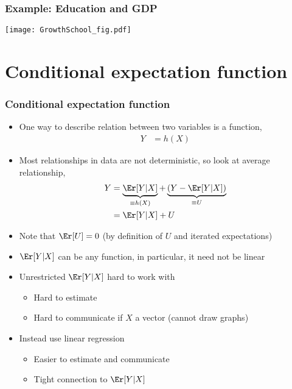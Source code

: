 \begin{frame}\frametitle{Example: Education and GDP}
\texttt{[image: GrowthSchool\_fig.pdf]}
\end{frame}


\section{Conditional expectation function}

\begin{frame}[allowframebreaks]
  \frametitle{Conditional expectation function}
  \begin{itemize}
  \item One way to describe relation between two variables is a
    function, 
    \begin{align*} 
Y &= h(X) 
\end{align*}
  \item Most relationships in data are not deterministic, so look at
    average relationship,
    \begin{align*}
      Y &=  \underbrace{\Er[Y|X]}_{\equiv h(X)} + \underbrace{\left(Y
          - \Er[Y|X]\right)}_{\equiv U}  \\  
      &= \Er[Y|X] + U
    \end{align*}
  \item Note that $\Er[U] = 0$ (by definition of $U$ and
    iterated expectations)
  \item $\Er[Y|X]$ can be any function, in particular, it need not be
    linear
  \item Unrestricted $\Er[Y|X]$ hard to work with
    \begin{itemize} 
    \item Hard to estimate
    \item Hard to communicate if $X$ a vector (cannot draw graphs) 
    \end{itemize}
  \item Instead use linear regression
    \begin{itemize}
    \item Easier to estimate and communicate
    \item Tight connection to $\Er[Y|X]$
    \end{itemize}
  \end{itemize}
\end{frame}  


